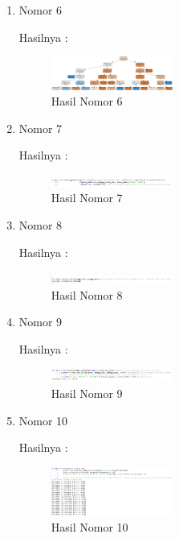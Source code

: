 \begin{enumerate}
\item Nomor 6
\hfill\break
	
Hasilnya :
\begin{figure}[H]
		\includegraphics[width=4cm]{figures/1174073/2/6.png}
		\centering
		\caption{Hasil Nomor 6}
\end{figure}

\item Nomor 7
\hfill\break
	
Hasilnya :
\begin{figure}[H]
		\includegraphics[width=4cm]{figures/1174073/2/7.png}
		\centering
		\caption{Hasil Nomor 7}
\end{figure}

\item Nomor 8
\hfill\break
	
Hasilnya :
\begin{figure}[H]
		\includegraphics[width=4cm]{figures/1174073/2/8.png}
		\centering
		\caption{Hasil Nomor 8}
\end{figure}

\item Nomor 9
\hfill\break
	
Hasilnya :
\begin{figure}[H]
		\includegraphics[width=4cm]{figures/1174073/2/9.png}
		\centering
		\caption{Hasil Nomor 9}
\end{figure}

\item Nomor 10
\hfill\break
	
Hasilnya :
\begin{figure}[H]
		\includegraphics[width=4cm]{figures/1174073/2/10.png}
		\centering
		\caption{Hasil Nomor 10}
\end{figure}


\end{enumerate}
